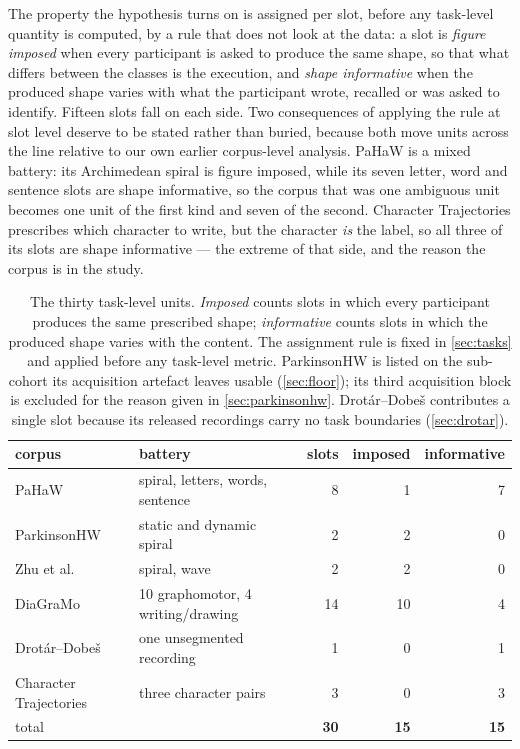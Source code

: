 The property the hypothesis turns on is assigned per slot, before any task-level quantity is
computed, by a rule that does not look at the data: a slot is \emph{figure imposed} when every
participant is asked to produce the same shape, so that what differs between the classes is the
execution, and \emph{shape informative} when the produced shape varies with what the participant
wrote, recalled or was asked to identify. Fifteen slots fall on each side. Two consequences of
applying the rule at slot level deserve to be stated rather than buried, because both move units
across the line relative to our own earlier corpus-level analysis. PaHaW is a mixed battery: its
Archimedean spiral is figure imposed, while its seven letter, word and sentence slots are shape
informative, so the corpus that was one ambiguous unit becomes one unit of the first kind and seven
of the second. Character Trajectories prescribes which character to write, but the character
\emph{is} the label, so all three of its slots are shape informative --- the extreme of that side,
and the reason the corpus is in the study.

\begin{table}[htbp]
\caption{The thirty task-level units. \emph{Imposed} counts slots in which every participant
produces the same prescribed shape; \emph{informative} counts slots in which the produced shape
varies with the content. The assignment rule is fixed in \cref{sec:tasks} and applied before any
task-level metric. ParkinsonHW is listed on the sub-cohort its acquisition artefact leaves usable
(\cref{sec:floor}); its third acquisition block is excluded for the reason given in
\cref{sec:parkinsonhw}. Drot\'ar--Dobe\v{s} contributes a single slot because its released
recordings carry no task boundaries (\cref{sec:drotar}).}
\label{tab:tasks}
\begin{center}
\begin{small}
\begin{tabular}{llrrr}
\toprule
corpus & battery & slots & imposed & informative \\
\midrule
PaHaW & spiral, letters, words, sentence & 8 & 1 & 7 \\
ParkinsonHW & static and dynamic spiral & 2 & 2 & 0 \\
Zhu et al. & spiral, wave & 2 & 2 & 0 \\
DiaGraMo & 10 graphomotor, 4 writing/drawing & 14 & 10 & 4 \\
Drot\'ar--Dobe\v{s} & one unsegmented recording & 1 & 0 & 1 \\
Character Trajectories & three character pairs & 3 & 0 & 3 \\
\midrule
total & & \textbf{30} & \textbf{15} & \textbf{15} \\
\bottomrule
\end{tabular}
\end{small}
\end{center}
\end{table}

